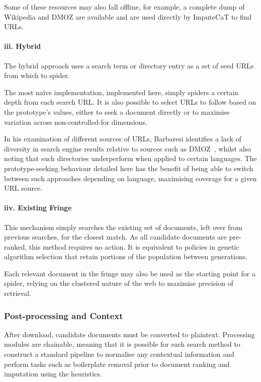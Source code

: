 Some of these resources may also fall offline, for example, a complete dump of Wikipedia and DMOZ are available and are used directly by ImputeCaT to find URLs.


\paragraph{iii. Hybrid}
The hybrid approach uses a search term or directory entry as a set of seed URLs from which to spider.

The most na\"ive implementation, implemented here, simply spiders a certain depth from each search URL.  It is also possible to select URLs to follow based on the prototype's values, either to seek a document directly or to maximise variation across non-controlled-for dimensions.

In his examination of different sources of URLs, Barbaresi identifies a lack of diversity in search engine results relative to sources such as DMOZ~\cite[p.~5]{barbaresi2014finding}, whilst also noting that such directories underperform when applied to certain languages.  The prototype-seeking behaviour detailed here has the benefit of being able to switch between such approaches depending on language, maximising coverage for a given URL source.




\paragraph{iiv. Existing Fringe}
This mechanism simply searches the existing set of documents, left over from previous searches, for the closest match.  As all candidate documents are pre-ranked, this method requires no action.  It is equivalent to policies in genetic algorithm selection that retain portions of the population between generations.

Each relevant document in the fringe may also be used as the starting point for a spider, relying on the clustered nature of the web to maximise precision of retrieval.  


\subsubsection{Post-processing and Context}
After download, candidate documents must be converted to plaintext.  Processing modules are chainable, meaning that it is possible for each search method to construct a standard pipeline to normalise any contextual information and perform tasks such as boilerplate removal prior to document ranking and imputation using the heuristics.

